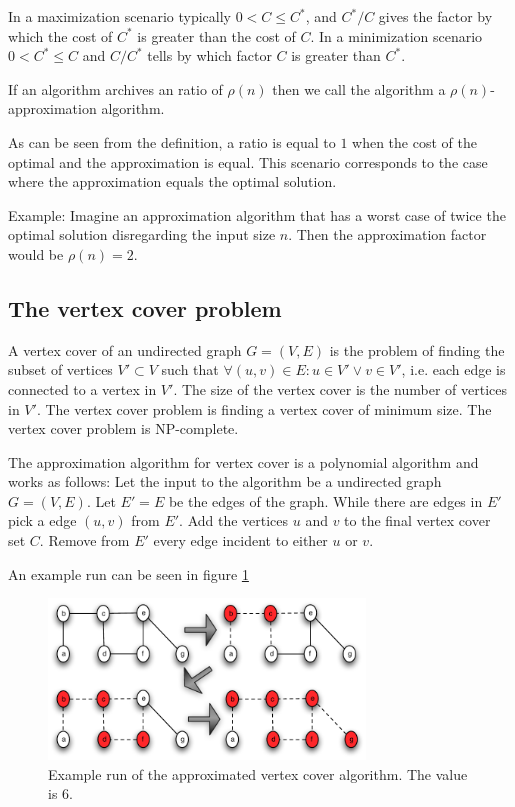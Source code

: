 \documentclass[10pt]{article}
\begin{document}
In a maximization scenario typically $0 < C \leq C^*$, and $C^*/C$ gives the factor by which the cost of $C^*$ is greater than the cost of $C$. In a minimization scenario $0 < C^* \leq C$ and $C/C^*$ tells by which factor $C$ is greater than $C^*$.

If an algorithm archives an ratio of $\rho(n)$ then we call the algorithm a $\rho(n)$-approximation algorithm.

As can be seen from the definition, a ratio is equal to $1$ when the cost of the optimal and the approximation is equal. This scenario corresponds to the case where the approximation equals the optimal solution.

Example: Imagine an approximation algorithm that has a worst case of twice the optimal solution disregarding the input size $n$. Then the approximation factor would be $\rho(n)=2$.


\subsection{The vertex cover problem} %
\label{sub:the_vertex_cover_problem}

A vertex cover of an undirected graph $G=(V,E)$ is the problem of finding the subset of vertices $V' \subset V$ such that $\forall (u,v) \in E: u \in V' \vee v \in V'$, i.e. each edge is connected to a vertex in $V'$. The size of the vertex cover is the number of vertices in $V'$. The vertex cover problem is finding a vertex cover of minimum size. The vertex cover problem is NP-complete. 

The approximation algorithm for vertex cover is a polynomial algorithm and works as follows: Let the input to the algorithm be a undirected graph $G = (V,E)$. Let $E' = E$ be the edges of the graph. While there are edges in $E'$ pick a edge $(u,v)$ from $E'$. Add the vertices $u$ and $v$ to the final vertex cover set $C$. Remove from $E'$ every edge incident to either $u$ or $v$.

An example run can be seen in figure \ref{fig12}

\begin{figure}[ht]
\centering
\includegraphics[width=0.75\textwidth]{figures/fig12.pdf}
\caption{Example run of the approximated vertex cover algorithm. The value is 6.}
\label{fig12}
\end{figure}
\end{document}
